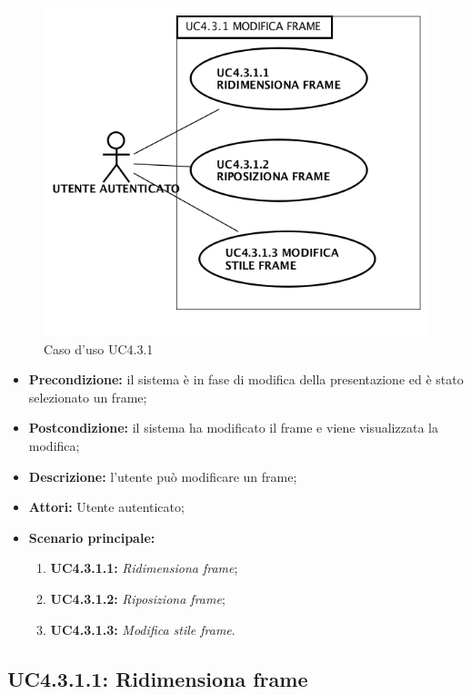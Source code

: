 \begin{figure}[h]
	\begin{center}
	\includegraphics[scale=0.4]{diagram/UC4-3-1.png}
	\caption{Caso d'uso UC4.3.1}
	\end{center}
\end{figure}
\begin{itemize}
	\item \textbf{Precondizione:} il sistema è in fase di modifica della presentazione ed è stato selezionato un frame;
	\item \textbf{Postcondizione:} il sistema ha modificato il frame e viene visualizzata la modifica;
	\item \textbf{Descrizione:} l'utente può modificare un frame;
	\item \textbf{Attori:} Utente autenticato;
	\item \textbf{Scenario principale:}
	\begin{enumerate}
		\item \textbf{ UC4.3.1.1:} \textit{ Ridimensiona frame};
		\item \textbf{ UC4.3.1.2:} \textit{ Riposiziona frame};
		\item \textbf{ UC4.3.1.3:} \textit{ Modifica stile frame}.
	\end{enumerate}
\end{itemize}
\subsection{ UC4.3.1.1: Ridimensiona frame}


